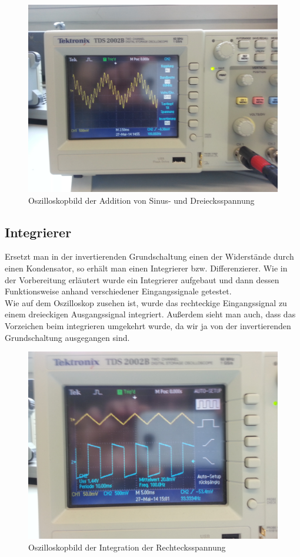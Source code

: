 \documentclass[a4paper,titlepage]{scrartcl}
\numberwithin{equation}{section}
\begin{document}
\begin{figure}[H]
\centering
\includegraphics[scale=.08]{bilder/aufgabe_3_2_2.jpg} 
\caption{Oszilloskopbild der Addition von Sinus- und Dreiecksspannung}
\end{figure}

\subsection{Integrierer}

Ersetzt man in der invertierenden Grundschaltung einen der Widerstände durch einen Kondensator, so erhält man einen Integrierer bzw. Differenzierer. Wie in der Vorbereitung erläutert wurde ein Integrierer aufgebaut und dann dessen Funktionsweise anhand verschiedener Eingangssignale getestet.\\
Wie auf dem Oszilloskop zusehen ist, wurde das rechteckige Eingangssignal zu einem dreieckigen Ausgangssignal integriert. Außerdem sieht man auch, dass das Vorzeichen beim integrieren umgekehrt wurde, da wir ja von der invertierenden Grundschaltung ausgegangen sind.

\begin{figure}[H]
\centering
\includegraphics[scale=.08]{bilder/aufgabe_3_3_1.jpg} 
\caption{Oszilloskopbild der Integration der Rechtecksspannung}
\end{figure}
\end{document}
